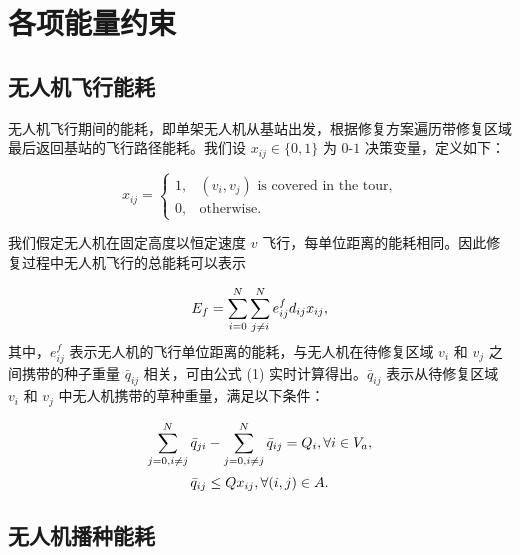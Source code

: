 \documentclass[AutoFakeBold]{LZUThesis}
\begin{document}
\section{各项能量约束}

\subsection{无人机飞行能耗}

无人机飞行期间的能耗，即单架无人机从基站出发，根据修复方案遍历带修复区域最后返回基站的飞行路径能耗。我们设 $x_{ij} \in \{0,1\}$ 为 $0$-$1$ 决策变量，定义如下：

\begin{equation}
	x_{ij} =
	\begin{cases}
		1, & \mbox{$(v_i,v_j)$ is covered in the tour,} \\
		0, & \mbox{otherwise}.
	\end{cases}
\end{equation}

我们假定无人机在固定高度以恒定速度 $v$ 飞行，每单位距离的能耗相同。因此修复过程中无人机飞行的总能耗可以表示

\begin{equation} \label{flight-energy}
	\begin{scriptsize}
		E_f =  \sum^N_{i=0}\sum^N_{j \neq i} e^f_{ij} d_{ij} x_{ij},
	\end{scriptsize}
\end{equation}
其中，$e^f_{ij}$ 表示无人机的飞行单位距离的能耗，与无人机在待修复区域 $v_i$ 和 $v_j$ 之间携带的种子重量 $\bar{q}_{ij}$ 相关，可由公式 (1) 实时计算得出。$\bar{q}_{ij}$ 表示从待修复区域 $v_i$ 和 $v_j$ 中无人机携带的草种重量，满足以下条件：

\begin{equation} \label{remained-weight}
	\begin{scriptsize}
		\sum^N_{j=0, i\neq j}\bar{q}_{ji} -  \sum^N_{j=0, i\neq j}\bar{q}_{ij} = Q_i, \forall i \in V_a,
	\end{scriptsize}
\end{equation}
\begin{equation} \label{demanded-weight}
	\begin{small}
		\bar{q}_{ij} \leq Q x_{ij}, \forall (i,j) \in A.
	\end{small}
\end{equation}

\subsection{无人机播种能耗}
\end{document}
